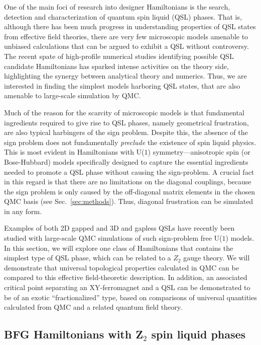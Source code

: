 \documentclass[10pt,pre,aps,twocolumn,showpacs,superscriptaddress,floatfix]{revtex4-1}
\begin{document}
One of the main foci of research into designer Hamiltonians is the search, detection and characterization of quantum spin liquid (QSL) phases.  That is, although there 
has been much progress in understanding properties of QSL states from effective field theories, there are very few microscopic models amenable to unbiased calculations 
that can be argued to exhibit a QSL without controversy. The recent spate of high-profile numerical studies identifying possible QSL candidate Hamiltonians \cite{Yan,Meng10,J1J2} 
has sparked intense activities on the theory side, highlighting the synergy between analytical theory and numerics. Thus, we are interested in finding the simplest models 
harboring QSL states, that are also amenable to large-scale simulation by QMC.

Much of the reason for the scarcity of microscopic models is that fundamental ingredients required to give rise to QSL phases, namely geometrical frustration, are also typical 
harbingers of the sign problem.  Despite this, the absence of the sign problem does not fundamentally {\it preclude} the existence of spin liquid physics.  This is most evident 
in Hamiltonians with U($1$) symmetry---anisotropic spin (or Bose-Hubbard) models specifically designed to capture the essential ingredients needed to promote a QSL phase without 
causing the sign-problem. A crucial fact in this regard is that there are no limitations on the diagonal couplings, because the sign problem is only caused by the off-diagonal
matrix elements in the chosen QMC basis (see Sec.~\ref{sec:methods}). Thus, diagonal frustration can be simulated in any form.

Examples of both 2D gapped \cite{Isakov1,Isakov2,Long,TopoEE} and 3D and gapless \cite{Isakov3} QSLs have recently been studied with large-scale QMC simulations of 
such sign-problem free U($1$) models. In this section, we will explore one class of Hamiltonians that contains the simplest type of QSL phase, which can be related to a 
$Z_2$ gauge theory. We will demonstrate that universal topological properties calculated in QMC can be compared to this effective field-theoretic description.  
In addition, an associated critical point separating an XY-ferromagnet and a QSL can be demonstrated to be of an exotic ``fractionalized'' type, based on comparisons of 
universal quantities calculated from QMC and a related quantum field theory.

\subsection{BFG Hamiltonians with Z$_2$ spin liquid phases}
\label{sec:bfgz2}
\end{document}
